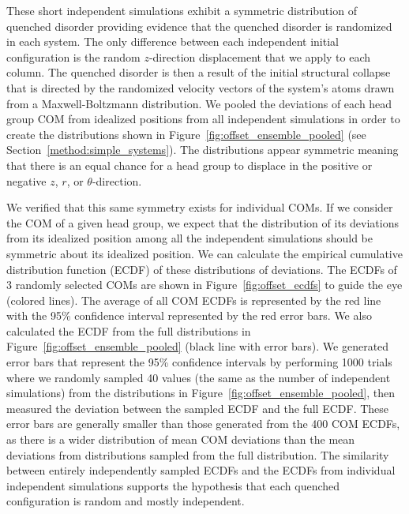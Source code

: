   These short independent simulations exhibit a symmetric distribution of
  quenched disorder providing evidence that the quenched disorder is randomized
  in each system.  The only difference between each independent initial
  configuration is the random $z$-direction displacement that we apply to each
  column. The quenched disorder is then a result of the initial structural
  collapse that is directed by the randomized velocity vectors of the system's
  atoms drawn from a Maxwell-Boltzmann distribution. We pooled the deviations of
  each head group COM from idealized positions from all independent simulations
  in order to create the distributions shown in
  Figure~\ref{fig:offset_ensemble_pooled} (see
  Section~\ref{method:simple_systems}). The distributions appear symmetric
  meaning that there is an equal chance for a head group to displace in the
  positive or negative $z$, $r$, or $\theta$-direction.

  We verified that this same symmetry exists for individual COMs.  If we
  consider the COM of a given head group, we expect that the distribution of its
  deviations from its idealized position among all the independent simulations
  should be symmetric about its idealized position. We can calculate the
  empirical cumulative distribution function (ECDF) of these distributions of
  deviations. The ECDFs of 3 randomly selected COMs are shown in
  Figure~\ref{fig:offset_ecdfs} to guide the eye (colored lines). The average of
  all COM ECDFs is represented by the red line with the 95\% confidence interval
  represented by the red error bars. We also calculated the ECDF from the full
  distributions in Figure~\ref{fig:offset_ensemble_pooled} (black line with error
  bars). We generated error bars that represent the 95\% confidence intervals by
  performing 1000 trials where we randomly sampled 40 values (the same as the
  number of independent simulations) from the distributions in
  Figure~\ref{fig:offset_ensemble_pooled}, then measured the deviation between
  the sampled ECDF and the full ECDF. These error bars are generally smaller than
  those generated from the 400 COM ECDFs, as there is a wider distribution of
  mean COM deviations than the mean deviations from distributions sampled from
  the full distribution. The similarity between entirely independently sampled
  ECDFs and the ECDFs from individual independent simulations supports the
  hypothesis that each quenched configuration is random and mostly independent.
  
